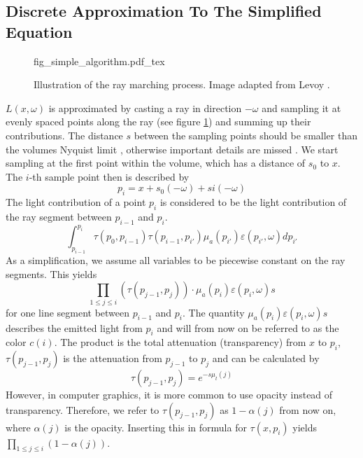 \subsection{Discrete Approximation To The Simplified Equation}

\begin{figure}
\centering
\def\svgwidth{\columnwidth}
{fig_simple_algorithm.pdf_tex}

\caption{Illustration of the ray marching process. Image adapted from Levoy \cite{10.1145/78964.78965}.}
\label{fig:simple_algorithm}
\end{figure}



$L({x},\omega )$ is approximated by casting a ray in direction $-\omega$ and sampling it at evenly spaced points along the ray (see figure \ref{fig:simple_algorithm}) and summing up their contributions\cite{511}. The distance $s$ between the sampling points should be smaller than the volumes Nyquist limit \cite{659497}, otherwise important details are missed \cite{10.1145/2661229.2661292}.
We start sampling at the first point within the volume, which has a distance of $s_0$ to ${x}$. The $i$-th sample point then is described by
\begin{equation}
p_i={x} + s_0(-\omega) + si(-\omega)
\end{equation}
The light contribution of a point $p_i$ is considered to be the light contribution of the ray segment between $p_{i-1}$ and $p_i$.
\begin{equation}
\int_{p_{i-1}}^{p_i} \tau (p_0,p_{i-1}) \tau(p_{i-1},p_{i'}) \mu_a(p_{i'})\varepsilon (p_{i'}, \omega)dp_{i'}
\end{equation} 
As a simplification, we assume all variables to be piecewise constant\cite{10.1145/147130.147155} on the ray segments. This yields
\begin{equation}
{\prod_{1\le j \le i}{(\tau(p_{j-1}, p_j))} \cdot \mu_a(p_{i})\varepsilon (p_{i}, \omega)s}
\end{equation} 
for one line segment between $p_{i-1}$ and $p_i$.
The quantity $\mu_a(p_{i})\varepsilon (p_{i}, \omega)s$ describes the emitted light from $p_i$ and will from now on be referred to as the color $c(i)$. The product is the total attenuation (transparency) from ${x}$ to $p_i$, $\tau(p_{j-1}, p_j)$ is the attenuation from $p_{j-1}$ to $p_j$ and can be calculated by
\begin{equation}
\tau(p_{j-1}, p_j) = e^{-s\mu_t(j)}
\end{equation}
However, in computer graphics, it is more common to use opacity instead of transparency. Therefore, we refer to $\tau(p_{j-1}, p_j)$ as $1 - \alpha(j)$ from now on, where $\alpha(j)$ is the opacity. Inserting this in formula for $\tau({x}, p_i)$ yields $\prod_{1 \le j \le i} (1 - \alpha(j))$.

